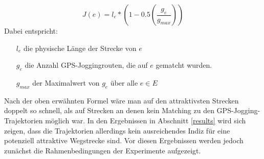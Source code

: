 \documentclass[12pt]{article}
\begin{document}
\begin{equation}
	J(e) = l_{e} * \left( 1 - 0.5\left( \frac{ g_{e} }{ g_{max} } \right) \right)
\end{equation}
Dabei entspricht:
\begin{itemize}
\item[$l_{e}$] die physische Länge der Strecke von $e$
\item[$g_{e}$] die Anzahl GPS-Joggingrouten, die auf $e$ gematcht wurden.
\item[$g_{max}$] der Maximalwert von $g_{e}$ über alle $e \in E$
\end{itemize}

Nach der oben erwähnten Formel wäre man auf den attraktivsten Strecken doppelt so schnell, als auf Strecken an denen kein Matching zu den GPS-Jogging-Trajektorien möglich war. In den Ergebnissen in Abschnitt \ref{results} wird sich zeigen, dass die Trajektorien allerdings kein ausreichendes Indiz für eine potenziell attraktive Wegstrecke sind. Vor diesen Ergebnissen werden jedoch zunächst die Rahmenbedingungen der Experimente aufgezeigt.
\end{document}
